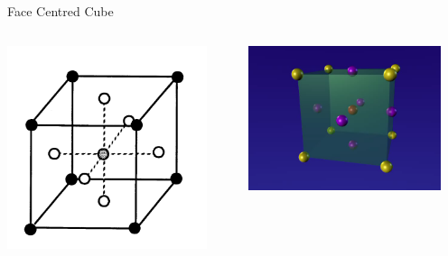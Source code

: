 \documentclass[14pt]{beamer}
\begin{document}
\begin{frame}{Face Centred Cube}
\pause

\begin{columns}
    \begin{column}{0.5\textwidth}
      \includegraphics[width=0.9\textwidth]{CCF.png}
    \end{column}
    \pause
    \begin{column}{0.5\textwidth}
      \includegraphics[width=0.9\textwidth]{CCF3D.png}
    \end{column}
  \end{columns}

\end{frame}
\end{document}
